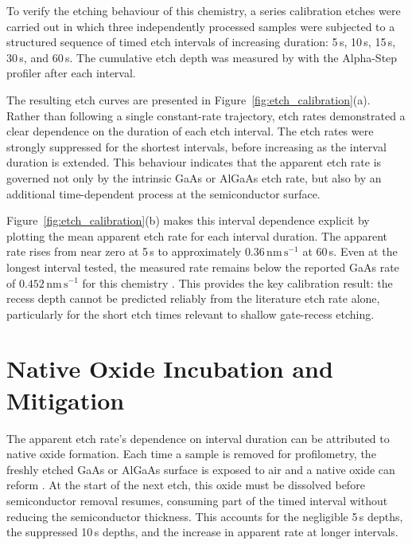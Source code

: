 \vspace{1mm}

To verify the etching behaviour of this chemistry, a series calibration 
etches were carried out in which three independently processed samples were 
subjected to a structured sequence of timed etch intervals of increasing duration: 
5\,s, 10\,s, 15\,s, 30\,s, and 60\,s. The cumulative etch depth was measured 
by with the Alpha-Step profiler after each interval. \cite{leedscleanroom_equipment} 

\vspace{1mm}

The resulting etch curves are presented in Figure~\ref{fig:etch_calibration}(a). 
Rather than following a single constant-rate trajectory, etch rates
demonstrated a clear dependence on the duration of each etch interval. 
The etch rates were strongly suppressed for the shortest intervals, 
before increasing as the interval duration is extended. This behaviour 
indicates that the apparent etch rate is governed not only by the 
intrinsic GaAs or AlGaAs etch rate, but also by an additional
time-dependent process at the semiconductor surface.



Figure~\ref{fig:etch_calibration}(b) makes this interval dependence explicit
by plotting the mean apparent etch rate for each interval duration. The apparent
rate rises from near zero at 5\,s to approximately
$0.36\,\mathrm{nm\,s}^{-1}$ at 60\,s. Even at the
longest interval tested, the measured rate remains below the reported GaAs
rate of $0.452\,\mathrm{nm\,s}^{-1}$ for this chemistry \cite{guan_etching}.
This provides the key calibration result: the recess depth cannot be predicted
reliably from the literature etch rate alone, particularly for the
short etch times relevant to shallow gate-recess etching.

\FloatBarrier

\section{Native Oxide Incubation and Mitigation}
\label{sec:native_oxide_mitigation}

The apparent etch rate's dependence on interval duration can be attributed to
native oxide formation. Each time a sample is removed for profilometry, the
freshly etched GaAs or AlGaAs surface is exposed to air and a native oxide can
reform \cite{moriarty1992preliminary}. At the start of the next etch, this
oxide must be dissolved before semiconductor removal resumes, consuming part of
the timed interval without reducing the semiconductor thickness. This accounts
for the negligible 5\,s depths, the suppressed 10\,s depths, and the increase
in apparent rate at longer intervals.

